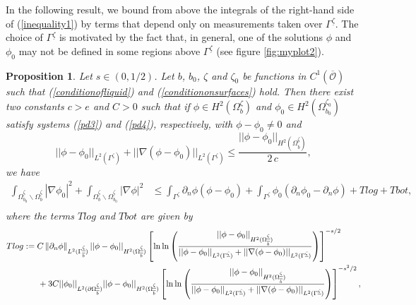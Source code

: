 \documentclass[11pt]{article}
\newtheorem{proposition}[theorem]{Proposition}
\begin{document}
In the following result, we bound from above the integrals of the right-hand side of  (\ref{inequality1}) by terms that depend only on measurements taken over $\Gamma^{\underline{\zeta}}$.  The choice of $\Gamma^{\underline{\zeta}}$ is motivated by the fact that, in general,  one of the solutions $\phi$ and $\phi_0$ may not be defined in some regions above $\Gamma^{\underline{\zeta}}$ (see figure \ref{fig:myplot2}).
\begin{proposition}\label{thoeremgeneral}
	 Let $s\in (0,1/2)$. Let $b$, $b_0$, $\zeta$ and $\zeta_0$ be functions in $C^1\left(\overline{\mathcal O }\right)$ such that (\ref{conditionofliquid}) and (\ref{conditiononsurfaces}) hold.  Then there exist two constants $c>e$ and $C>0$ such that if $\phi\in H^2(\Omega^{\zeta}_{b})$ and $\phi_0\in H^2(\Omega^{\zeta_0}_{b_0})$ satisfy systems (\ref{pd3}) and (\ref{pd4}), respectively, with $\phi -\phi _0\ne 0$ and 
	 $$||\phi-\phi_0||_{L^2(\Gamma^{\underline{\zeta}})}+||\nabla (\phi-\phi_0)||_{L^2(\Gamma^{\underline{\zeta}})}\leq\frac{||\phi-\phi_0||_{H^2(\Omega_{\overline{b}}^{\underline{\zeta}})}}{2\,c}, $$
	 we have
	\begin{equation}\label{inequality3}
		\begin{split}
			\displaystyle\int_{\Omega_{b_0}^{\underline{\zeta}}\backslash \Omega_{b}^{\underline{\zeta}}}\left|\nabla\phi_0\right|^2+\displaystyle\int_{\Omega_{b}^{\underline{\zeta}}\backslash \Omega_{b_0}^{\underline{\zeta}}}\left|\nabla\phi\right|^2
			&\leq \displaystyle\int_{\Gamma^{\underline{\zeta}}} \partial_n\phi(\phi-\phi_0)+\displaystyle\int_{\Gamma^{\underline{\zeta}}} \phi_0(\partial_n\phi_0-\partial_n\phi)+Tlog+Tbot,\\
		\end{split}
	\end{equation}
	where  the terms $Tlog$ and $Tbot$ are given by 
	\begin{equation}\label{logterm}
		\begin{split}
			Tlog&:=C \left\Vert \partial_n \phi\right\Vert_{L^{2}(\Gamma_{\overline{b}}^{\underline{\zeta}} )}||\phi-\phi_0||_{H^2(\Omega_{\overline{b}}^{\underline{\zeta}})} \left[  \ln\ln\left(   \dfrac{||\phi-\phi_0||_{H^2(\Omega_{\overline{b}}^{\underline{\zeta}})}}{||\phi-\phi_0||_{L^2(\Gamma^{\underline{\zeta}})}+||\nabla(\phi-\phi_0)||_{L^2(\Gamma^{\underline{\zeta}})}}     \right)      \right]^{-s/2}\\&\hspace{0.6cm}+3C || \phi_0||_{L^2(\partial\Omega_{\overline{b}}^{\underline{\zeta}})}||\phi-\phi_0||_{H^2(\Omega_{\overline{b}}^{\underline{\zeta}})} \left[  \ln\ln\left(   \dfrac{||\phi-\phi_0||_{H^2(\Omega_{\overline{b}}^{\underline{\zeta}})}}{||\phi-\phi_0||_{L^2(\Gamma^{\underline{\zeta}})}+||\nabla (\phi-\phi_0)||_{L^2(\Gamma^{\underline{\zeta}})}}     \right)      \right]^{-s^2/2},

\end{split}
\end{equation}
\end{proposition}
\end{document}

